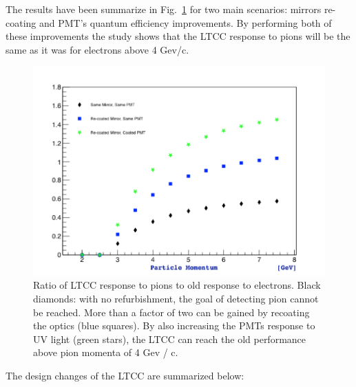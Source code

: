 The results have been summarize in Fig.~\ref{fig:refurbishmentGains} for two main scenarios: mirrors re-coating and PMT's quantum efficiency improvements.
By performing both of these improvements the study shows that the LTCC response to pions will be the same as it was for electrons above 4 Gev/c.

\begin{figure}[h]
	\centering
	\includegraphics[width=0.95\columnwidth,keepaspectratio]{img/refurbishmentGains.png}
\caption{Ratio of LTCC response to pions to old response to electrons. Black diamonds: with no refurbishment, the goal of detecting pion cannot be reached.
          More than a factor of two can be gained by recoating the optics (blue squares). By also increasing the PMTs response to UV light (green stars), the
          LTCC can reach the old performance above pion momenta of 4 Gev / c.}
	\label{fig:refurbishmentGains}
\end{figure}


The design changes of the LTCC are summarized below:

